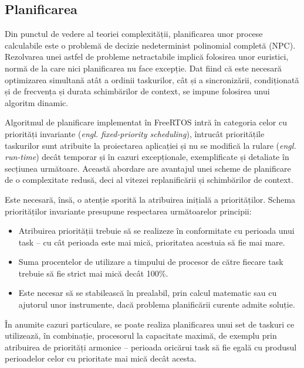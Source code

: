 \subsection{Planificarea}

Din punctul de vedere al teoriei complexității, planificarea unor procese calculabile este o problemă de decizie nedeterminist polinomial completă (NPC). Rezolvarea unei astfel de probleme netractabile implică folosirea unor \mbox{euristici}, normă de la care nici planificarea nu face excepție. Dat fiind că este \mbox{necesară} \mbox{optimizarea} simultană atât a ordinii taskurilor, cât și a sincronizării, condiționată și de frecvența și durata schimbărilor de context, se impune folosirea unui \mbox{algoritm} dinamic. \cite{lee}


Algoritmul de planificare implementat în FreeRTOS intră în categoria \mbox{celor} cu priorități invariante (\textit{engl. fixed-priority scheduling}), întrucât prioritățile \mbox{taskurilor} sunt atribuite la proiectarea aplicației și nu se modifică la rulare (\textit{engl. run-time}) \mbox{decât} temporar și în cazuri excepționale, exemplificate și detaliate în secțiunea \mbox{următoare}. Această abordare are avantajul unei scheme de planificare de o \mbox{complexitate} redusă, deci al vitezei replanificării și schimbărilor de context.

Este necesară, însă, o atenție sporită la atribuirea inițială a priorităților. Schema priorităților invariante presupune respectarea următoarelor principii:

\begin{itemize}
  \item Atribuirea priorității trebuie să se realizeze în conformitate cu perioada unui task -- cu cât perioada este mai mică, prioritatea acestuia să fie mai mare.
  \item Suma procentelor de utilizare a timpului de procesor de către fiecare task trebuie să fie strict mai mică decât 100\%.
  \item Este necesar să se stabilească în prealabil, prin calcul matematic sau cu ajutorul unor instrumente, dacă problema planificării curente admite soluție.
\end{itemize}

În anumite cazuri particulare, se poate realiza planificarea unui set de \mbox{taskuri} ce utilizează, în combinație, procesorul la capacitate maximă, de exemplu prin atribuirea de priorități armonice -- perioada oricărui task să fie egală cu produsul perioadelor celor cu prioritate mai mică decât acesta. \cite{cortexm}

